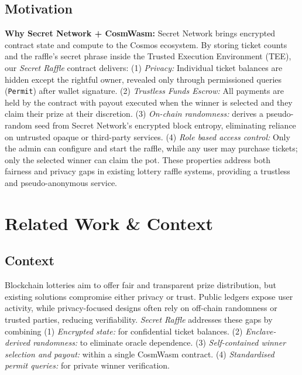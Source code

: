 \documentclass[9pt]{extarticle}
\begin{document}
\subsection{Motivation}
\textbf{Why Secret Network + CosmWasm:} Secret Network brings encrypted contract state and compute to the Cosmos ecosystem. By storing ticket counts and the raffle's secret phrase inside the Trusted Execution Environment (TEE), our \emph{Secret Raffle} contract delivers: (1) \emph{Privacy:} Individual ticket balances are hidden except the rightful owner, revealed only through permissioned queries (\texttt{Permit}) after wallet signature. (2) \emph{Trustless Funds Escrow:} All payments are held by the contract with payout executed when the winner is selected and they claim their prize at their discretion. (3) \emph{On-chain randomness:} derives a pseudo-random seed from Secret Network's encrypted block entropy, eliminating reliance on untrusted opaque or third-party services. (4) \emph{Role based access control:} Only the admin can configure and start the raffle, while any user may purchase tickets; only the selected winner can claim the pot. These properties address both fairness and privacy gaps in existing lottery raffle systems, providing a trustless and pseudo-anonymous service.

\section{Related Work \& Context}
\subsection{Context}
Blockchain lotteries aim to offer fair and transparent prize distribution, but existing solutions compromise either privacy or trust. Public ledgers expose user activity, while privacy-focused designs often rely on off-chain randomness or trusted parties, reducing verifiability. \emph{Secret Raffle} addresses these gaps by combining (1) \emph{Encrypted state:} for confidential ticket balances. (2) \emph{Enclave-derived randomness:} to eliminate oracle dependence. (3) \emph{Self-contained winner selection and payout:} within a single CosmWasm contract. (4) \emph{Standardised permit queries:} for private winner verification.
\end{document}
